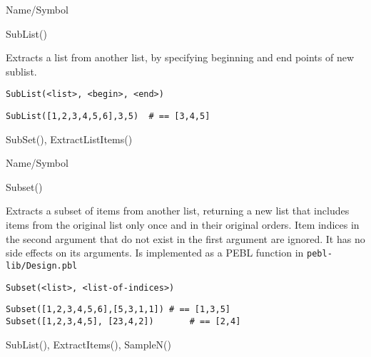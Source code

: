 \rl


\begin{desc}{Name/Symbol}
\item[Name/Symbol]  	SubList()

\item[Description] 	Extracts a list from another list, by specifying 
	     	beginning and end points of new sublist.

\item[Usage]
\begin{verbatim}
SubList(<list>, <begin>, <end>)
\end{verbatim}

\item[Example]     	
\begin{verbatim}
SubList([1,2,3,4,5,6],3,5)	# == [3,4,5]
\end{verbatim}

\item[See Also]    	SubSet(), ExtractListItems()
\end{desc}

\rl


\begin{desc}{Name/Symbol}
\item[Name/Symbol]  	Subset()

\item[Description] 	Extracts a subset of items from another list, returning a
	     	new list that includes items from the original list only
	     	once and in their original orders.  Item indices in the
	     	second argument that do not exist in the first argument
	     	are ignored.  It has no side effects on its arguments.
	     	Is implemented as a PEBL function in \verb+pebl-lib/Design.pbl+

\item[Usage]       	
\begin{verbatim}
Subset(<list>, <list-of-indices>)
\end{verbatim}

\item[Example]     	
\begin{verbatim}
Subset([1,2,3,4,5,6],[5,3,1,1])	# == [1,3,5]
Subset([1,2,3,4,5], [23,4,2])		# == [2,4]
\end{verbatim}

\item[See Also]   	SubList(), ExtractItems(), SampleN()
\end{desc}

\rl


